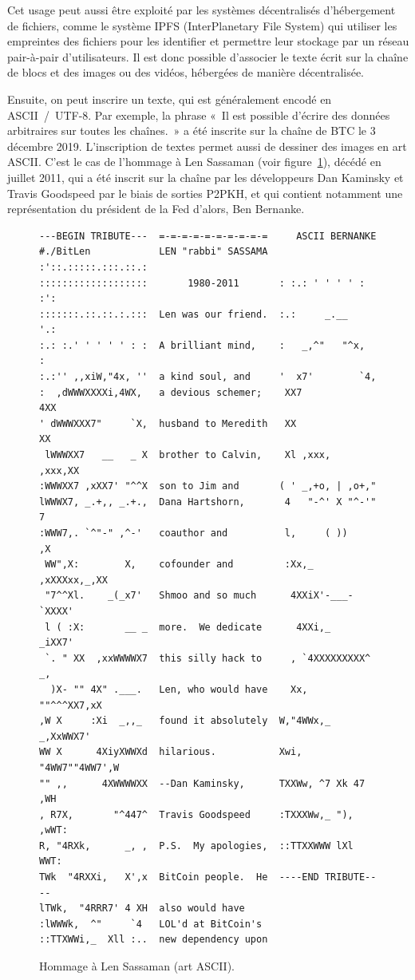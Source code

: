 Cet usage peut aussi être exploité par les systèmes décentralisés d'hébergement de fichiers, comme le système IPFS (InterPlanetary File System) qui utiliser les empreintes des fichiers pour les identifier et permettre leur stockage par un réseau pair-à-pair d'utilisateurs. Il est donc possible d'associer le texte écrit sur la chaîne de blocs et des images ou des vidéos, hébergées de manière décentralisée.

Ensuite, on peut inscrire un texte, qui est généralement encodé en ASCII~/~UTF-8. Par exemple, la phrase «~Il est possible d'écrire des données arbitraires sur toutes les chaînes.~» a été inscrite sur la chaîne de BTC le 3 décembre 2019. L'inscription de textes permet aussi de dessiner des images en art ASCII. C'est le cas de l'hommage à Len Sassaman (voir figure~\ref{fig:sassaman-tribute}), décédé en juillet 2011, qui a été inscrit sur la chaîne par les développeurs Dan Kaminsky et Travis Goodspeed par le biais de sorties P2PKH, et qui contient notamment une représentation du président de la Fed d'alors, Ben Bernanke.

\begin{figure}[h]
  \begin{Verbatim}[fontsize=\small]
---BEGIN TRIBUTE---  =-=-=-=-=-=-=-=-=-=     ASCII BERNANKE
#./BitLen            LEN "rabbi" SASSAMA  :'::.:::::.:::.::.:
:::::::::::::::::::       1980-2011       : :.: ' ' ' ' : :':
:::::::.::.::.:.:::  Len was our friend.  :.:     _.__    '.:
:.: :.' ' ' ' ' : :  A brilliant mind,    :   _,^"   "^x,   :
:.:'' ,,xiW,"4x, ''  a kind soul, and     '  x7'        `4,
:  ,dWWWXXXXi,4WX,   a devious schemer;    XX7            4XX
' dWWWXXX7"     `X,  husband to Meredith   XX              XX
 lWWWXX7   __   _ X  brother to Calvin,    Xl ,xxx,   ,xxx,XX
:WWWXX7 ,xXX7' "^^X  son to Jim and       ( ' _,+o, | ,o+,"
lWWWX7, _.+,, _.+.,  Dana Hartshorn,       4   "-^' X "^-'" 7
:WWW7,. `^"-" ,^-'   coauthor and          l,     ( ))     ,X
 WW",X:        X,    cofounder and         :Xx,_ ,xXXXxx,_,XX
 "7^^Xl.    _(_x7'   Shmoo and so much      4XXiX'-___-`XXXX'
 l ( :X:       __ _  more.  We dedicate      4XXi,_   _iXX7'
 `. " XX  ,xxWWWWX7  this silly hack to     , `4XXXXXXXXX^ _,
  )X- "" 4X" .___.   Len, who would have    Xx,  ""^^^XX7,xX
,W X     :Xi  _,,_   found it absolutely  W,"4WWx,_ _,XxWWX7'
WW X      4XiyXWWXd  hilarious.           Xwi, "4WW7""4WW7',W
"" ,,      4XWWWWXX  --Dan Kaminsky,      TXXWw, ^7 Xk 47 ,WH
, R7X,       "^447^  Travis Goodspeed     :TXXXWw,_ "), ,wWT:
R, "4RXk,      _, ,  P.S.  My apologies,  ::TTXXWWW lXl WWT:
TWk  "4RXXi,   X',x  BitCoin people.  He  ----END TRIBUTE----
lTWk,  "4RRR7' 4 XH  also would have
:lWWWk,  ^"     `4   LOL'd at BitCoin's
::TTXWWi,_  Xll :..  new dependency upon
  \end{Verbatim}
  \caption{Hommage à Len Sassaman (art ASCII).}
  \label{fig:sassaman-tribute}
\end{figure}

